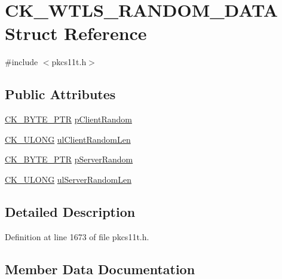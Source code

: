 \hypertarget{struct_c_k___w_t_l_s___r_a_n_d_o_m___d_a_t_a}{}\section{C\+K\+\_\+\+W\+T\+L\+S\+\_\+\+R\+A\+N\+D\+O\+M\+\_\+\+D\+A\+TA Struct Reference}
\label{struct_c_k___w_t_l_s___r_a_n_d_o_m___d_a_t_a}


{\ttfamily \#include $<$pkcs11t.\+h$>$}

\subsection*{Public Attributes}
\begin{DoxyCompactItemize}
\item 
\hyperlink{pkcs11t_8h_a3d7233a4077fbaf7ae76b64da0a62a21}{C\+K\+\_\+\+B\+Y\+T\+E\+\_\+\+P\+TR} \hyperlink{struct_c_k___w_t_l_s___r_a_n_d_o_m___d_a_t_a_a3796698993739c56f2578a0554fba33a}{p\+Client\+Random}
\item 
\hyperlink{pkcs11t_8h_a35181858a3b7a0a81f49d180d8f446ef}{C\+K\+\_\+\+U\+L\+O\+NG} \hyperlink{struct_c_k___w_t_l_s___r_a_n_d_o_m___d_a_t_a_a821ad4fcd011c6211ebaa6f4ede6e6b8}{ul\+Client\+Random\+Len}
\item 
\hyperlink{pkcs11t_8h_a3d7233a4077fbaf7ae76b64da0a62a21}{C\+K\+\_\+\+B\+Y\+T\+E\+\_\+\+P\+TR} \hyperlink{struct_c_k___w_t_l_s___r_a_n_d_o_m___d_a_t_a_a45281876a3693977cc419fc41e026c72}{p\+Server\+Random}
\item 
\hyperlink{pkcs11t_8h_a35181858a3b7a0a81f49d180d8f446ef}{C\+K\+\_\+\+U\+L\+O\+NG} \hyperlink{struct_c_k___w_t_l_s___r_a_n_d_o_m___d_a_t_a_a7701c5a19b31181433fe42690e5a3e4b}{ul\+Server\+Random\+Len}
\end{DoxyCompactItemize}


\subsection{Detailed Description}


Definition at line 1673 of file pkcs11t.\+h.



\subsection{Member Data Documentation}
\mbox{\label{struct_c_k___w_t_l_s___r_a_n_d_o_m___d_a_t_a_a3796698993739c56f2578a0554fba33a}} 
